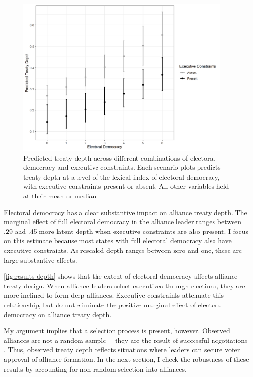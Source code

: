 \documentclass[12pt]{article}
\begin{document}
\begin{figure}[hbtp]
\centering
\includegraphics[width=0.95\textwidth]{../figures/results-depth.png}
\caption{Predicted treaty depth across different combinations of electoral democracy and executive constraints. Each scenario plots predicts treaty depth at a level of the lexical index of electoral democracy, with executive constraints present or absent. All other variables held at their mean or median.}
\label{fig:results-depth}
\end{figure}


Electoral democracy has a clear substantive impact on alliance treaty depth.
The marginal effect of full electoral democracy in the alliance leader ranges between .29 and .45 more latent depth when executive constraints are also present.
I focus on this estimate because most states with full electoral democracy also have executive constraints. 
As rescaled depth ranges between zero and one, these are large substantive effects.

\autoref{fig:results-depth} shows that the extent of electoral democracy affects alliance treaty design.
When alliance leaders select executives through elections, they are more inclined to form deep alliances. 
Executive constraints attenuate this relationship, but do not eliminate the positive marginal effect of electoral democracy on alliance treaty depth. 


My argument implies that a selection process is present, however. 
Observed alliances are not a random sample--- they are the result of successful negotiations \citep{Poast2019a}. 
Thus, observed treaty depth reflects situations where leaders can secure voter approval of alliance formation.
In the next section, I check the robustness of these results by accounting for non-random selection into alliances. 
\end{document}
